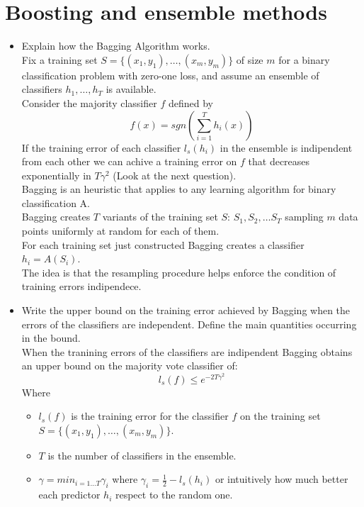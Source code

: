 \newpage
\section{Boosting and ensemble methods}

\begin{itemize}

    \item Explain how the Bagging Algorithm works.\\

    Fix a training set $S = \{(x_1 , y_1),\dots,(x_m , y_m)\}$ of size $m$ for a binary classification problem with zero-one loss, and 
    assume an ensemble of classifiers $h_1, \dots , h_T$ is available.\\
    Consider the majority classifier $f$ defined by $$f(x) = sgn(\sum_{i=1}^{T} {h_i(x)})$$
    If the training error of each classifier $l_s(h_i)$ in the ensemble is indipendent from each other we can achive a training error on $f$ that decreases exponentially in $T\gamma^2$ (Look at the next question).\\
    Bagging is an heuristic that applies to any learning algorithm for binary classification A.\\ 
    Bagging creates $T$ variants of the training set $S$: $S_1, S_2, \dots S_T$ sampling $m$ data points uniformly at random for each of them.\\
    For each training set just constructed Bagging creates a classifier $h_i = A(S_i)$.\\
    The idea is that the resampling procedure helps enforce the condition of training errors indipendece.\\

    \item Write the upper bound on the training error achieved by Bagging when the errors of the classifiers are independent. Define the main quantities occurring in the bound.\\

        When the tranining errors of the classifiers are indipendent Bagging obtains an upper bound on the majority vote classifier of:
        $$l_s(f) \leq e^{-2T\gamma^2}$$
        Where
        \begin{itemize}
            \item $l_s(f)$ is the training error for the classifier $f$ on the training set $S = \{(x_1 , y_1),\dots,(x_m , y_m)\}$.\\
            \item $T$ is the number of classifiers in the ensemble.\\
            \item $\gamma = min_{i=1 \dots T} \gamma_i$ where  $\gamma_i = \frac{1}{2} - l_s(h_i)$ or intuitively how much better each predictor $h_i$ respect to the random one.\\
        \end{itemize}
    

\end{itemize}
